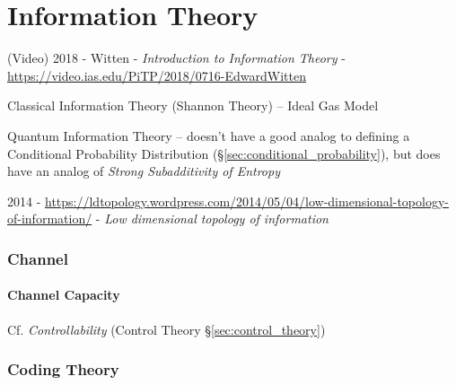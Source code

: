 \part{Information Theory}\label{part:information_theory} \cite{shannon48}

(Video) 2018 - Witten - \emph{Introduction to Information Theory} -
\url{https://video.ias.edu/PiTP/2018/0716-EdwardWitten}

Classical Information Theory (Shannon Theory) -- Ideal Gas Model

Quantum Information Theory -- doesn't have a good analog to defining a
Conditional Probability Distribution (\S\ref{sec:conditional_probability}), but
does have an analog of \emph{Strong Subadditivity of Entropy}

2014 -
\url{https://ldtopology.wordpress.com/2014/05/04/low-dimensional-topology-of-information/} -
\emph{Low dimensional topology of information}



\section{Channel}\label{sec:channel}

\subsection{Channel Capacity}\label{sec:channel_capacity}

\fist Cf. \emph{Controllability} (Control Theory
\S\ref{sec:control_theory})



\section{Coding Theory}\label{sec:coding_theory}

